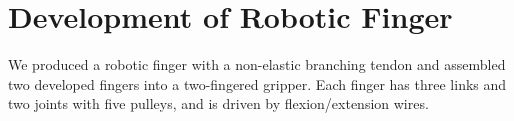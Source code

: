 \documentclass{llncs}
\begin{document}

																																			




\section{Development of Robotic Finger} %
\label{sec:producing}
	
We produced a robotic finger with a non-elastic branching tendon and assembled two developed fingers into a two-fingered gripper.
Each finger has three links and two joints with five pulleys, and is driven by flexion/extension wires.

\end{document}
